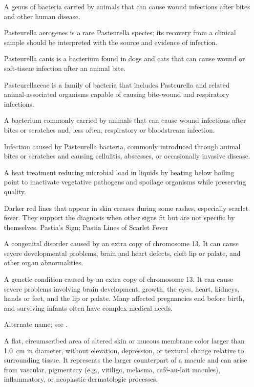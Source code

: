  A genus of bacteria carried by animals that can cause wound infections after bites and other human disease.

 Pasteurella aerogenes is a rare Pasteurella species; its recovery from a clinical sample should be interpreted with the source and evidence of infection.

 Pasteurella canis is a bacterium found in dogs and cats that can cause wound or soft-tissue infection after an animal bite.

 Pasteurellaceae is a family of bacteria that includes Pasteurella and related animal-associated organisms capable of causing bite-wound and respiratory infections.

 A bacterium commonly carried by animals that can cause wound infections after bites or scratches and,
less often, respiratory or bloodstream infection.

 Infection caused by Pasteurella bacteria, commonly introduced through animal bites or scratches and causing cellulitis, abscesses, or occasionally invasive disease.

 A heat treatment reducing microbial load in liquids by heating below boiling point to
inactivate vegetative pathogens and spoilage organisms while preserving quality.

 Darker red lines that appear in skin creases during some rashes, especially scarlet fever. They support the diagnosis when other signs fit but are not specific by themselves.
\synonyms
Pastia's Sign; Pastia Lines of Scarlet Fever

 A congenital disorder caused by an extra copy of chromosome 13. It can cause severe developmental problems, brain and heart defects, cleft lip or palate, and other organ abnormalities.

 A genetic condition caused by an extra copy of chromosome 13. It can cause severe problems involving brain development, growth, the eyes, heart, kidneys, hands or feet, and the lip or palate. Many affected pregnancies end before birth, and surviving infants often have complex medical needs.

 Alternate name; see
  .

 A flat, circumscribed area of altered skin or mucous membrane color larger than 1.0~cm in diameter, without elevation, depression, or textural change relative to surrounding tissue. It represents the larger counterpart of a macule and can arise from vascular, pigmentary (e.g., vitiligo, melasma, café-au-lait macules), inflammatory, or neoplastic dermatologic processes.

